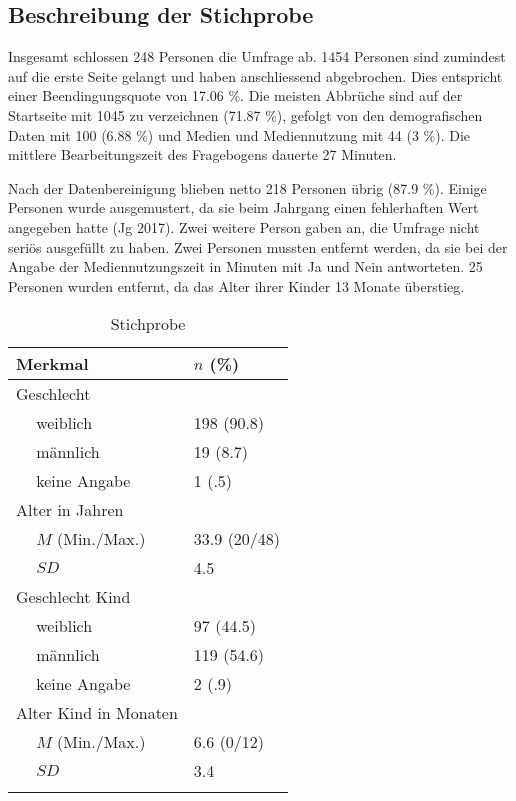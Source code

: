 \subsection{Beschreibung der Stichprobe}
Insgesamt schlossen 248 Personen die Umfrage ab. 1454 Personen sind zumindest auf die erste Seite gelangt und haben anschliessend abgebrochen. Dies entspricht einer Beendingungsquote von 17.06 \%. Die meisten Abbrüche sind auf der Startseite mit 1045 zu verzeichnen (71.87 \%), gefolgt von den demografischen Daten mit 100 (6.88 \%) und Medien und Mediennutzung mit 44 (3 \%). Die mittlere Bearbeitungszeit des Fragebogens dauerte 27 Minuten. 

Nach der Datenbereinigung blieben netto 218 Personen übrig (87.9 \%). Einige Personen wurde ausgemustert, da sie beim Jahrgang einen fehlerhaften Wert angegeben hatte (Jg 2017). Zwei weitere Person gaben an, die Umfrage nicht seriös ausgefüllt zu haben. Zwei Personen mussten entfernt werden, da sie bei der Angabe der Mediennutzungszeit in Minuten mit Ja und Nein antworteten. 25 Personen wurden entfernt, da das Alter ihrer Kinder 13 Monate überstieg. 

\begin{table}[htbp]
\centering
\captionsetup{margin=110pt,skip=5pt}
\caption{Stichprobe}
\begin{tabular}{m{0.5em}  m{10em}  m{5em}} 
  \hline\hline
  \multicolumn{2}{l}{\textbf{Merkmal}} & \textbf{$n$ (\%)} \\
  \hline
  \multicolumn{2}{l}{Geschlecht} \\ 
   & weiblich & 198 (90.8)\\ 
   & männlich & 19 (8.7)\\ 
   & keine Angabe & 1 (.5)\\ 
   
  \multicolumn{2}{l}{Alter in Jahren} \\
   & $M$ (Min./Max.) & 33.9 (20/48) \\
   & $SD$ & 4.5 \\
  
  \multicolumn{2}{l}{Geschlecht Kind} \\
   & weiblich & 97 (44.5)\\ 
   & männlich & 119 (54.6)\\ 
   & keine Angabe & 2 (.9)\\
  
  \multicolumn{2}{l}{Alter Kind in Monaten} \\
   &  $M$ (Min./Max.) & 6.6 (0/12)\\
   & $SD$ & 3.4\\
  \hline\hline
  &&\\
\end{tabular}
\label{table:Stichprobe}
\end{table}

